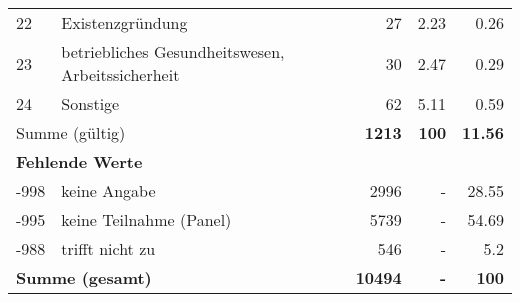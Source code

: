\begin{longtable}{lXrrr}
        22 & \multicolumn{1}{X}{Existenzgründung} & %
          \num{27} &
          \num[round-mode=places,round-precision=2]{2.23} &
          \num[round-mode=places,round-precision=2]{0.26} \\

        23 & \multicolumn{1}{X}{betriebliches Gesundheitswesen, Arbeitssicherheit} & %
          \num{30} &
          \num[round-mode=places,round-precision=2]{2.47} &
          \num[round-mode=places,round-precision=2]{0.29} \\

        24 & \multicolumn{1}{X}{Sonstige} & %
          \num{62} &
          \num[round-mode=places,round-precision=2]{5.11} &
          \num[round-mode=places,round-precision=2]{0.59} \\

     \midrule
     \multicolumn{2}{l}{Summe (gültig)} &
       \textbf{\num{1213}} &
     \textbf{\num{100}} &
       \textbf{\num[round-mode=places,round-precision=2]{11.56}} \\
     \multicolumn{5}{l}{\textbf{Fehlende Werte}}\\
       -998 &
       keine Angabe &
         \num{2996} &
        - &
         \num[round-mode=places,round-precision=2]{28.55} \\
       -995 &
       keine Teilnahme (Panel) &
         \num{5739} &
        - &
         \num[round-mode=places,round-precision=2]{54.69} \\
       -988 &
       trifft nicht zu &
         \num{546} &
        - &
         \num[round-mode=places,round-precision=2]{5.2} \\
     \midrule
     \multicolumn{2}{l}{\textbf{Summe (gesamt)}} &
          \textbf{\num{10494}} &
        \textbf{-} &
        \textbf{\num{100}} \\
     \bottomrule
     \end{longtable}
     
